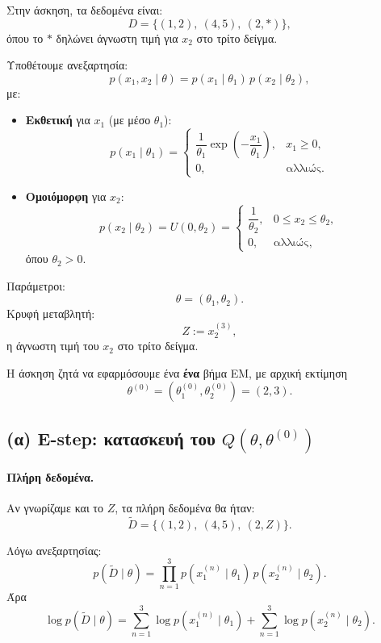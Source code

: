 \documentclass[a4paper,11pt]{article}
\begin{document}
Στην άσκηση, τα δεδομένα είναι:
\[
D = \{(1,2),\ (4,5),\ (2,\ast)\},
\]
όπου το $\ast$ δηλώνει άγνωστη τιμή για $x_2$ στο τρίτο δείγμα.

Υποθέτουμε ανεξαρτησία:
\[
p(x_1,x_2 \mid \theta) = p(x_1\mid\theta_1)\,p(x_2\mid\theta_2),
\]
με:

\begin{itemize}
  \item \textbf{Εκθετική} για $x_1$ (με μέσο $\theta_1$):
        \[
        p(x_1 \mid \theta_1) =
        \begin{cases}
          \dfrac{1}{\theta_1} \exp\!\left(-\dfrac{x_1}{\theta_1}\right),
            & x_1 \ge 0,\\[4pt]
          0, & \text{αλλιώς.}
        \end{cases}
        \]

  \item \textbf{Ομοιόμορφη} για $x_2$:
        \[
        p(x_2 \mid \theta_2) = U(0,\theta_2) =
        \begin{cases}
          \dfrac{1}{\theta_2}, & 0 \le x_2 \le \theta_2,\\[4pt]
          0, & \text{αλλιώς,}
        \end{cases}
        \]
        όπου $\theta_2 > 0$.
\end{itemize}

Παράμετροι:
\[
\theta = (\theta_1,\theta_2).
\]
Κρυφή μεταβλητή:
\[
Z := x_2^{(3)},
\]
η άγνωστη τιμή του $x_2$ στο τρίτο δείγμα.

Η άσκηση ζητά να εφαρμόσουμε ένα \textbf{ένα} βήμα EM, με αρχική εκτίμηση
\[
\theta^{(0)} = (\theta_1^{(0)},\theta_2^{(0)}) = (2,3).
\]

\subsection{(α) E-step: κατασκευή του \texorpdfstring{$Q(\theta,\theta^{(0)})$}{Q}}

\paragraph{Πλήρη δεδομένα.}
Αν γνωρίζαμε και το $Z$, τα πλήρη δεδομένα θα ήταν:
\[
\tilde{D} = \{(1,2),\ (4,5),\ (2,Z)\}.
\]

Λόγω ανεξαρτησίας:
\[
p(\tilde{D} \mid \theta)
= \prod_{n=1}^3 p(x_1^{(n)} \mid \theta_1)\, p(x_2^{(n)} \mid \theta_2).
\]
Άρα
\[
\log p(\tilde{D} \mid \theta)
= \sum_{n=1}^3 \log p(x_1^{(n)}\mid\theta_1)
+ \sum_{n=1}^3 \log p(x_2^{(n)}\mid\theta_2).
\]
\end{document}
